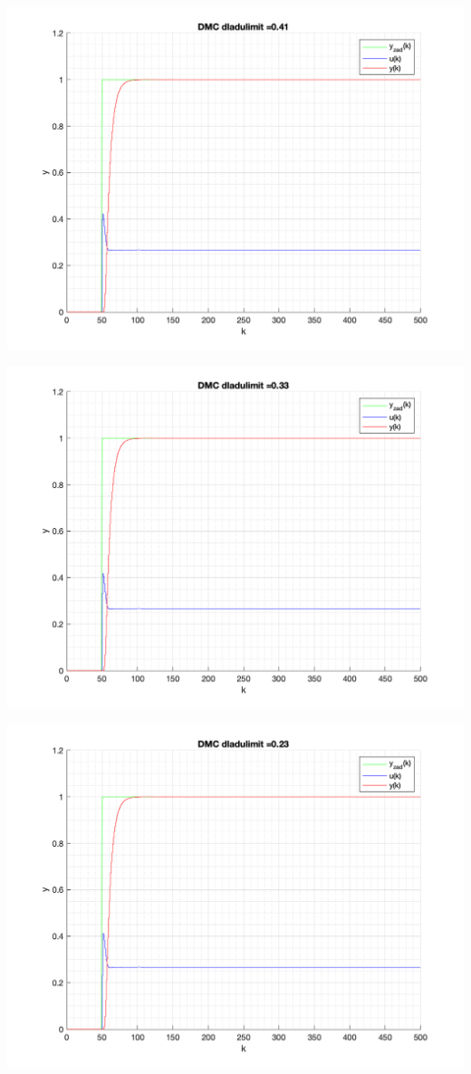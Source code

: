 \documentclass[a4paper, 11pt]{article}
\begin{document}
\begin{enumerate}
 \includegraphics[width=\linewidth]{./ModelsP6_dulimit/P4_DMC_dulimit_0_41_png.png} 
 
 \includegraphics[width=\linewidth]{./ModelsP6_dulimit/P4_DMC_dulimit_0_33_png.png} 
 
 \includegraphics[width=\linewidth]{./ModelsP6_dulimit/P4_DMC_dulimit_0_23_png.png} 
 

\end{enumerate}
\end{document}
